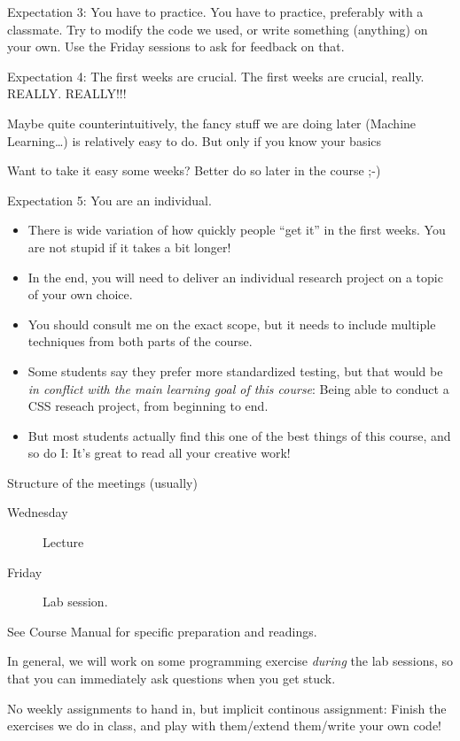\begin{frame}{Expectation 3: You have to practice.}
	You have to practice, preferably with a classmate. Try to modify the code we used, or write something (anything) on your own. Use the Friday sessions to ask for feedback on that.
\end{frame}




\begin{frame}{Expectation 4: The first weeks are crucial.}
The first weeks are crucial, really. REALLY. REALLY!!!

Maybe quite counterintuitively, the fancy stuff we are doing later (Machine Learning\ldots) is relatively easy to do. But only if you know your basics %

Want to take it easy some weeks? Better do so later in the course ;-)
\end{frame}






\begin{frame}{Expectation 5: You are an individual.}
\begin{itemize}
	\item There is wide variation of how quickly people ``get it'' in the first weeks. You are not stupid if it takes a bit longer!
	\item In the end, you will need to deliver an individual research project on a topic of your own choice.
	\item You should consult me on the exact scope, but it needs to include multiple techniques from both parts of the course.
	\item Some students say they prefer more standardized testing, but that would be \emph{in conflict with the main learning goal of this course}: Being able to conduct a CSS reseach project, from beginning to end.
	\item But most students actually find this one of the best things of this course, and so do I: It's great to read all your creative work!
\end{itemize}

\end{frame}




\begin{frame}{Structure of the meetings (usually)}
	\begin{description}
		\item[Wednesday] Lecture
		\item[Friday]Lab session.
	\end{description}
See Course Manual for specific preparation and readings.

In general, we will work on some programming exercise \emph{during} the lab sessions, so that you can immediately ask questions when you get stuck.

No weekly assignments to hand in, but implicit continous assignment: Finish the exercises we do in class, and play with them/extend them/write your own code!
\end{frame}

